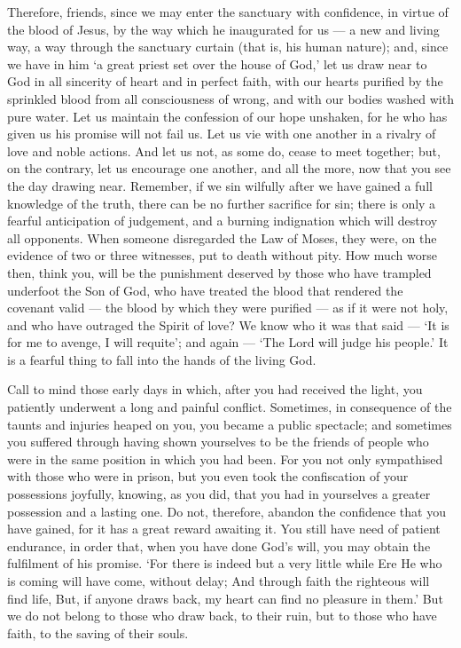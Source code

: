  Therefore, friends, since we may enter the sanctuary with
confidence, in virtue of the blood of Jesus,  by the way
which he inaugurated for us --- a new and living way, a way through the
sanctuary curtain (that is, his human nature);  and, since
we have in him `a great priest set over the house of God,' 
let us draw near to God in all sincerity of heart and in perfect faith,
with our hearts purified by the sprinkled blood from all consciousness
of wrong, and with our bodies washed with pure water.  Let
us maintain the confession of our hope unshaken, for he who has given us
his promise will not fail us.  Let us vie with one another
in a rivalry of love and noble actions.  And let us not, as
some do, cease to meet together; but, on the contrary, let us encourage
one another, and all the more, now that you see the day drawing near.
 Remember, if we sin wilfully after we have gained a full
knowledge of the truth, there can be no further sacrifice for sin;
 there is only a fearful anticipation of judgement, and a
burning indignation which will destroy all opponents.  When
someone disregarded the Law of Moses, they were, on the evidence of two
or three witnesses, put to death without pity.  How much
worse then, think you, will be the punishment deserved by those who have
trampled underfoot the Son of God, who have treated the blood that
rendered the covenant valid --- the blood by which they were purified
--- as if it were not holy, and who have outraged the Spirit of love?
 We know who it was that said --- `It is for me to avenge,
I will requite'; and again --- `The Lord will judge his people.'
 It is a fearful thing to fall into the hands of the living
God.

 Call to mind those early days in which, after you had
received the light, you patiently underwent a long and painful conflict.
 Sometimes, in consequence of the taunts and injuries
heaped on you, you became a public spectacle; and sometimes you suffered
through having shown yourselves to be the friends of people who were in
the same position in which you had been.  For you not only
sympathised with those who were in prison, but you even took the
confiscation of your possessions joyfully, knowing, as you did, that you
had in yourselves a greater possession and a lasting one. 
Do not, therefore, abandon the confidence that you have gained, for it
has a great reward awaiting it.  You still have need of
patient endurance, in order that, when you have done God's will, you may
obtain the fulfilment of his promise.  `For there is indeed
but a very little while Ere He who is coming will have come, without
delay;  And through faith the righteous will find life,
But, if anyone draws back, my heart can find no pleasure in them.'
 But we do not belong to those who draw back, to their
ruin, but to those who have faith, to the saving of their souls.

